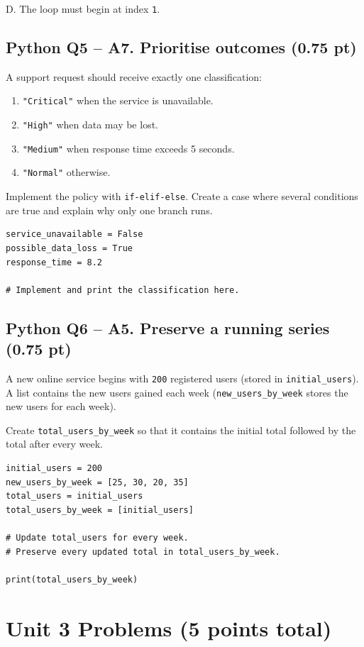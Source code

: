 \documentclass[10pt]{article}
\let\OldSection\section
\renewcommand{\section}{\clearpage\OldSection}
\begin{document}
D. The loop must begin at index \texttt{1}.


\clearpage
\subsection*{Python Q5 -- A7. Prioritise outcomes (0.75 pt)}
A support request should receive exactly one classification:
\begin{enumerate}
\item \texttt{"Critical"} when the service is unavailable.
\item \texttt{"High"} when data may be lost.
\item \texttt{"Medium"} when response time exceeds 5 seconds.
\item \texttt{"Normal"} otherwise.
\end{enumerate}
Implement the policy with \texttt{if-elif-else}. Create a case where several
conditions are true and explain why only one branch runs.

\begin{verbatim}
service_unavailable = False
possible_data_loss = True
response_time = 8.2

# Implement and print the classification here.
\end{verbatim}


\clearpage
\subsection*{Python Q6 -- A5. Preserve a running series (0.75 pt)}
A new online service begins with \texttt{200} registered users (stored in
\texttt{initial\_users}). A list contains the new users gained each week
(\texttt{new\_users\_by\_week} stores the new users for each week).

Create \texttt{total\_users\_by\_week} so that it contains the initial
total followed by the total after every week.

\begin{verbatim}
initial_users = 200
new_users_by_week = [25, 30, 20, 35]
total_users = initial_users
total_users_by_week = [initial_users]

# Update total_users for every week.
# Preserve every updated total in total_users_by_week.

print(total_users_by_week)
\end{verbatim}


\section*{Unit 3 Problems (5 points total)}
\end{document}
